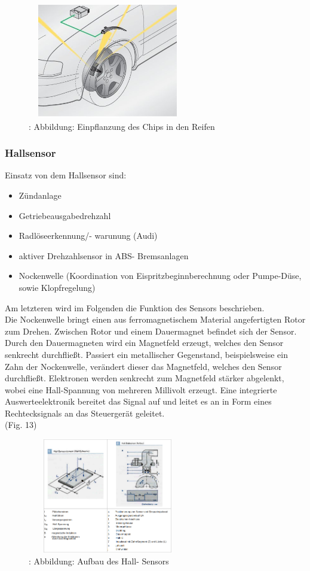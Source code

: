 				\begin{figure}
					\centering
					\includegraphics[width=7cm, height=5cm] {rdks.png}
					\caption {\cite{TS23}: Abbildung: Einpflanzung des Chips in den Reifen}
				\end{figure}
				
			\subsubsection{Hallsensor}
				Einsatz von dem Hallsensor sind: 
				\begin{itemize}
					\item Zündanlage
					\item Getriebeausgabedrehzahl
					\item Radlöseerkennung/- warunung (Audi)
					\item aktiver Drehzahlsensor in ABS- Bremsanlagen
					\item Nockenwelle (Koordination von Eispritzbeginnberechnung oder Pumpe-Düse, sowie Klopfregelung)
				\end{itemize}
				
				Am letzteren wird im Folgenden die Funktion des Sensors beschrieben.\\
				Die Nockenwelle bringt einen aus ferromagnetischem Material angefertigten Rotor zum Drehen. Zwischen Rotor und einem Dauermagnet befindet sich der Sensor. Durch den Dauermagneten wird ein Magnetfeld erzeugt, welches den Sensor senkrecht durchfließt. Passiert ein metallischer Gegenstand, beispielsweise ein Zahn der Nockenwelle, verändert dieser das Magnetfeld, welches den Sensor durchfließt.
				Elektronen werden senkrecht zum Magnetfeld stärker abgelenkt, wobei eine Hall-Spannung von mehreren Millivolt erzeugt. Eine integrierte Auswerteelektronik bereitet das Signal auf und leitet es an in Form eines Rechtecksignals an das Steuergerät geleitet.\\\cite{TS24}
				(Fig. 13)
				\begin{figure}
					\centering
					\includegraphics[width=7cm, height=5cm] {hall.png}
					\caption {\cite{TS25}: Abbildung: Aufbau des Hall- Sensors}
				\end{figure}
			
